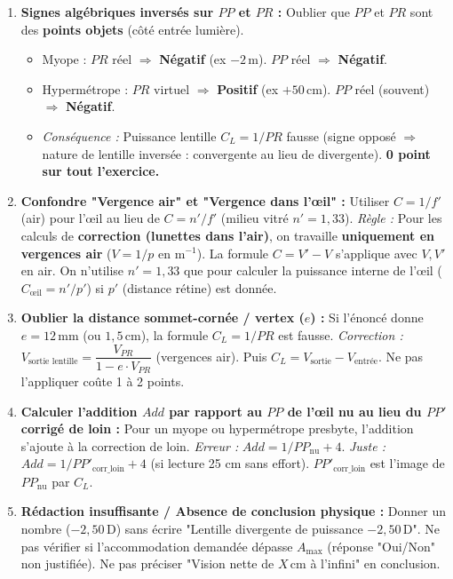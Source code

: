 \documentclass[11pt]{article}
\begin{document}
\begin{attention}
\begin{enumerate}
    \item \textbf{Signes algébriques inversés sur $PP$ et $PR$ :} Oublier que $PP$ et $PR$ sont des \textbf{points objets} (côté entrée lumière).
    \begin{itemize}
        \item Myope : $PR$ réel $\Rightarrow$ \textbf{Négatif} (ex $-2\,\text{m}$). $PP$ réel $\Rightarrow$ \textbf{Négatif}.
        \item Hypermétrope : $PR$ virtuel $\Rightarrow$ \textbf{Positif} (ex $+50\,\text{cm}$). $PP$ réel (souvent) $\Rightarrow$ \textbf{Négatif}.
        \item \textit{Conséquence :} Puissance lentille $C_L = 1/PR$ fausse (signe opposé $\Rightarrow$ nature de lentille inversée : convergente au lieu de divergente). \textbf{0 point sur tout l'exercice.}
    \end{itemize}
    \item \textbf{Confondre "Vergence air" et "Vergence dans l'œil" :} Utiliser $C = 1/f'$ (air) pour l'œil au lieu de $C = n'/f'$ (milieu vitré $n'=1,33$).
    \textit{Règle :} Pour les calculs de \textbf{correction (lunettes dans l'air)}, on travaille \textbf{uniquement en vergences air} ($V = 1/p$ en m$^{-1}$). La formule $C = V' - V$ s'applique avec $V, V'$ en air. On n'utilise $n'=1,33$ que pour calculer la puissance interne de l'œil ($C_{\text{œil}} = n'/p'$) si $p'$ (distance rétine) est donnée.
    \item \textbf{Oublier la distance sommet-cornée / vertex ($e$) :} Si l'énoncé donne $e = 12\,\text{mm}$ (ou $1,5\,\text{cm}$), la formule $C_L = 1/PR$ est fausse.
    \textit{Correction :} $V_{\text{sortie lentille}} = \dfrac{V_{PR}}{1 - e \cdot V_{PR}}$ (vergences air). Puis $C_L = V_{\text{sortie}} - V_{\text{entrée}}$. Ne pas l'appliquer coûte 1 à 2 points.
    \item \textbf{Calculer l'addition $Add$ par rapport au $PP$ de l'œil nu au lieu du $PP'$ corrigé de loin :} Pour un myope ou hypermétrope presbyte, l'addition s'ajoute à la correction de loin.
    \textit{Erreur :} $Add = 1/PP_{\text{nu}} + 4$.
    \textit{Juste :} $Add = 1/PP'_{\text{corr\_loin}} + 4$ (si lecture 25 cm sans effort). $PP'_{\text{corr\_loin}}$ est l'image de $PP_{\text{nu}}$ par $C_L$.
    \item \textbf{Rédaction insuffisante / Absence de conclusion physique :} Donner un nombre ($-2,50\,\text{D}$) sans écrire "Lentille divergente de puissance $-2,50\,\text{D}$". Ne pas vérifier si l'accommodation demandée dépasse $A_{\text{max}}$ (réponse "Oui/Non" non justifiée). Ne pas préciser "Vision nette de $X\,\text{cm}$ à l'infini" en conclusion.
\end{enumerate}
\end{attention}
\end{document}
